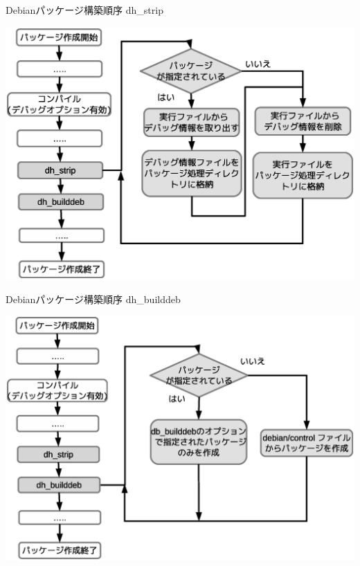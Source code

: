 \begin{frame}{Debianパッケージ構築順序}
dh\_strip
\begin{center}
\includegraphics[width=1.0\hsize]{image2012-gum/ddebug-gum-image-data-dh-strip.eps}
\end{center}
\end{frame}

\begin{frame}{Debianパッケージ構築順序}
dh\_builddeb
\begin{center}
\includegraphics[width=1.0\hsize]{image2012-gum/ddebug-gum-image-data-dh-builddeb.eps} 
\end{center}
\end{frame}

%
%
%

